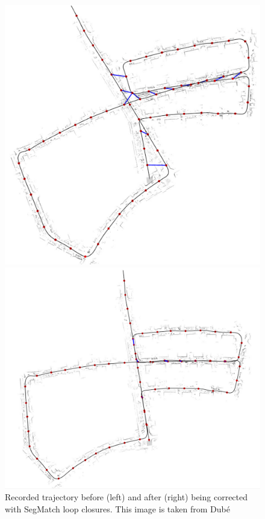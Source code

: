 \begin{figure}[!tbp]
  \centering
  \begin{minipage}[b]{0.4\textwidth}
    \includegraphics[width=\textwidth]{images/before_segmatch.pdf}
  \end{minipage}
  \hfill
  \begin{minipage}[b]{0.4\textwidth}
    \includegraphics[width=\textwidth]{images/after_segmatch.pdf}
  \end{minipage}
  \caption{Recorded trajectory before (left) and after (right) being corrected with SegMatch loop closures. This image is taken from Dubé \cite{segmatch}}
  \label{fig:corrected}
\end{figure}

